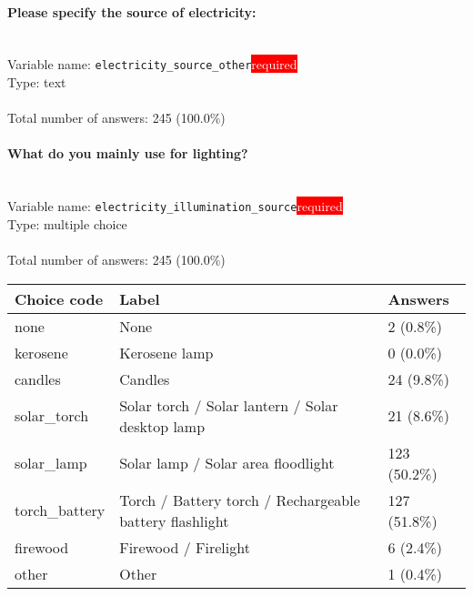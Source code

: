 \documentclass[11.5pt, a4paper]{scrartcl}
\begin{document}
\paragraph{Please specify the source of electricity:}
\  \\Variable name: \texttt{electricity\_source\_other}\hfill\colorbox{red}{\small{\textcolor{white}{required}}}\\
 Type: text\\
\\Total number of answers: 245 (100.0\%)
\\[0.2em]\paragraph{What do you mainly use for lighting?}
\  \\Variable name: \texttt{electricity\_illumination\_source}\hfill\colorbox{red}{\small{\textcolor{white}{required}}}\\
 Type: multiple choice\\
\\Total number of answers: 245 (100.0\%)
\\[0.2em] \begin{tabular}{p{4cm}|p{8cm}|p{3cm}}
Choice code & Label & Answers \\
\hline
none & None & \cellcolor{color0}2 (0.8\%)\\
\cellcolor{mygray} kerosene & \cellcolor{mygray}Kerosene lamp & \cellcolor{color0}0 (0.0\%)\\
candles & Candles& \cellcolor{color0}24 (9.8\%)\\
\cellcolor{mygray} solar\_torch & \cellcolor{mygray}Solar torch / Solar lantern / Solar desktop lamp & \cellcolor{color0}21 (8.6\%)\\
solar\_lamp & Solar lamp / Solar area floodlight& \cellcolor{color2}123 (50.2\%)\\
\cellcolor{mygray} torch\_battery & \cellcolor{mygray}Torch / Battery torch / Rechargeable battery flashlight & \cellcolor{color2}127 (51.8\%)\\
firewood & Firewood / Firelight& \cellcolor{color0}6 (2.4\%)\\
\cellcolor{mygray} other & \cellcolor{mygray}Other & \cellcolor{color0}1 (0.4\%)\\
\end{tabular}
\end{document}
